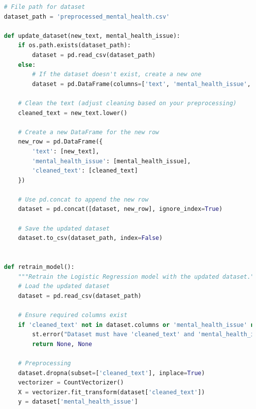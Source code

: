 \begin{tcolorbox}[colback=gray!5!white, colframe=gray!80!black, boxrule=0.5pt, title=Model Retraining Functionality]        
    \begin{lstlisting}[language=Python]
# File path for dataset
dataset_path = 'preprocessed_mental_health.csv'

def update_dataset(new_text, mental_health_issue):
    if os.path.exists(dataset_path):
        dataset = pd.read_csv(dataset_path)
    else:
        # If the dataset doesn't exist, create a new one
        dataset = pd.DataFrame(columns=['text', 'mental_health_issue', 'cleaned_text'])

    # Clean the text (adjust cleaning based on your preprocessing)
    cleaned_text = new_text.lower()

    # Create a new DataFrame for the new row
    new_row = pd.DataFrame({
        'text': [new_text],
        'mental_health_issue': [mental_health_issue],
        'cleaned_text': [cleaned_text]
    })

    # Use pd.concat to append the new row
    dataset = pd.concat([dataset, new_row], ignore_index=True)

    # Save the updated dataset
    dataset.to_csv(dataset_path, index=False)


def retrain_model():
    """Retrain the Logistic Regression model with the updated dataset."""
    # Load the updated dataset
    dataset = pd.read_csv(dataset_path)
    
    # Ensure required columns exist
    if 'cleaned_text' not in dataset.columns or 'mental_health_issue' not in dataset.columns:
        st.error("Dataset must have 'cleaned_text' and 'mental_health_issue' columns.")
        return None, None
    
    # Preprocessing
    dataset.dropna(subset=['cleaned_text'], inplace=True)
    vectorizer = CountVectorizer()
    X = vectorizer.fit_transform(dataset['cleaned_text'])
    y = dataset['mental_health_issue']
\end{lstlisting}
\end{tcolorbox}

